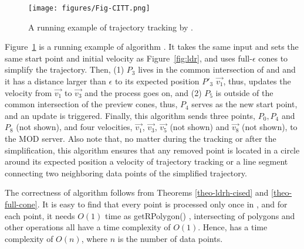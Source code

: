 \begin{figure}[tb!]
	\centering
	\texttt{[image: figures/Fig-CITT.png]}
	\vspace{-2ex}
	\caption{\small A running example of trajectory tracking by \citt. }
	\vspace{-3ex}
	\label{fig:citt}
\end{figure}


\begin{example}
	Figure~\ref{fig:citt} is a running example of algorithm \citt. It takes the same input and sets the same start point and initial velocity as Figure~\ref{fig:ldr}, and uses full-$\epsilon$ cones to simplify the trajectory. Then, (1) $P_3$ lives in the common intersection of  and  and it has a distance larger than $\epsilon$ to its expected position $P'_3$ \wrt $\vec{v_1}$, thus, \citt updates the velocity from $\vec{v_1}$ to $\vec{v_3}$ and the process goes on, and (2) $P_5$ is outside of the common intersection of the preview cones, thus, $P_4$ serves as the new start point, and an update is triggered. Finally, this algorithm sends three points, $P_0, P_4$ and $P_8$ (not shown), and four velocities, $\vec{v_1}$, $\vec{v_3}$, $\vec{v_5}$ (not shown) and $\vec{v_8}$ (not shown), to the MOD server. Also note that, no matter during the tracking or after the simplification, this algorithm ensures that any removed point is located in a circle around its expected position \wrt a velocity of trajectory tracking or a line segment connecting two neighboring data points of the simplified trajectory. 
\end{example}


The correctness of algorithm \citt follows from Theorems \ref{theo-ldrh-cised} and \ref{theo-full-cone}.
It is easy to find that every point is processed only once in \citt, and for each point, it needs $O(1)$ time as getRPolygon() \cite{Lin:Cised}, intersecting of polygons \cite{Lin:Cised} and {other operations} all have a time complexity of $O(1)$. Hence, \citt has a time complexity of $O(n)$, where $n$ is the number of data points.






